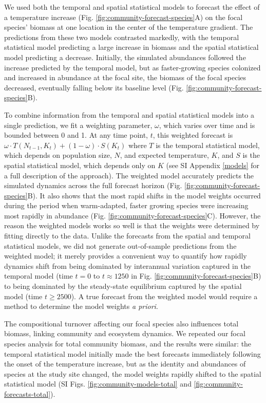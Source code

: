 \documentclass[11pt]{article}
\begin{document}
We used both the temporal and spatial statistical models to forecast the effect of a temperature increase (Fig. \ref{fig:community-forecast-species}A) on the focal species' biomass at one location in the center of the temperature gradient. 
The predictions from these two models contrasted markedly, with the temporal 
statistical model predicting a large increase in biomass and the spatial statistical model predicting a decrease. Initially, the simulated abundances followed the increase predicted by the 
temporal model, but as faster-growing species colonized and increased in abundance at the focal site, the biomass of the focal species decreased, eventually falling below its baseline level (Fig. \ref{fig:community-forecast-species}B). 

To combine information from the temporal and spatial statistical models into a single prediction, we fit a weighting parameter, $\omega$, which varies over time and is bounded between 0 and 1. At any time point, $t$, this weighted forecast is $\omega \cdot T(N_{t-1},K_t) + (1-\omega) \cdot S(K_t) $ where $T$ is the temporal statistical model, which depends on population size, $N$, and expected temperature, $K$, and $S$ is the spatial statistical model, which depends only on $K$ (see SI Appendix \ref{models} for a full description of the approach). The weighted model accurately predicts the simulated dynamics across the full forecast horizon (Fig. \ref{fig:community-forecast-species}B). It also shows that the most rapid shifts in the model weights occurred during the period when warm-adapted, faster growing species were increasing most rapidly in abundance (Fig. \ref{fig:community-forecast-species}C). However, the reason the weighted models works so well is that the weights were determined by fitting directly to the data. Unlike the forecasts from the spatial and temporal statistical models, we did not generate out-of-sample predictions from the weighted model; it merely provides a convenient way to quantify how rapidly dynamics shift from being dominated by interannual variation captured in the temporal model (time $t=0$ to $t \approx 1250$ in Fig. \ref{fig:community-forecast-species}B) to being dominated by the steady-state equilibrium captured by the spatial model (time $t \geq 2500$). A true forecast from the weighted model would require a method to determine the model weights \emph{a priori}. 

The compositional turnover affecting our focal species also influences total biomass, linking community and ecosystem dynamics. We repeated our focal species analysis for total community biomass, and the results were similar: the temporal statistical model initially made the best forecasts immediately following the onset of the temperature increase, but as the identity and abundances of species at the study site changed, the model weights rapidly shifted to the spatial statistical model (SI Figs. \ref{fig:community-models-total} and \ref{fig:community-forecasts-total}). 
\end{document}

